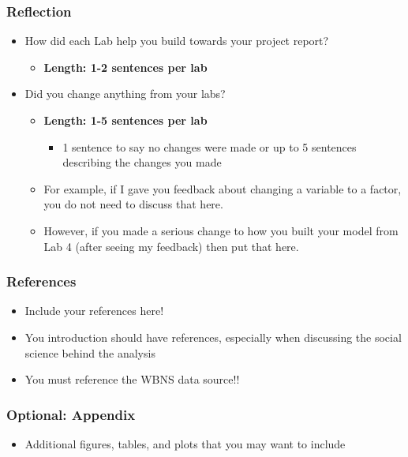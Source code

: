\documentclass[
  letterpaper,
  DIV=11,
  numbers=noendperiod]{scrartcl}
\providecommand{\tightlist}{%
  \setlength{\itemsep}{0pt}\setlength{\parskip}{0pt}}\usepackage{longtable,booktabs,array}
\begin{document}
\subsubsection{Reflection}\label{reflection}

\begin{itemize}
\tightlist
\item
  How did each Lab help you build towards your project report?

  \begin{itemize}
  \tightlist
  \item
    \textbf{Length: 1-2 sentences per lab}
  \end{itemize}
\item
  Did you change anything from your labs?

  \begin{itemize}
  \tightlist
  \item
    \textbf{Length: 1-5 sentences per lab}

    \begin{itemize}
    \tightlist
    \item
      1 sentence to say no changes were made or up to 5 sentences
      describing the changes you made
    \end{itemize}
  \item
    For example, if I gave you feedback about changing a variable to a
    factor, you do not need to discuss that here.
  \item
    However, if you made a serious change to how you built your model
    from Lab 4 (after seeing my feedback) then put that here.
  \end{itemize}
\end{itemize}

\subsubsection{References}\label{references}

\begin{itemize}
\tightlist
\item
  Include your references here!
\item
  You introduction should have references, especially when discussing
  the social science behind the analysis
\item
  You must reference the WBNS data source!!
\end{itemize}

\subsubsection{Optional: Appendix}\label{optional-appendix}

\begin{itemize}
\tightlist
\item
  Additional figures, tables, and plots that you may want to include
\end{itemize}
\end{document}
